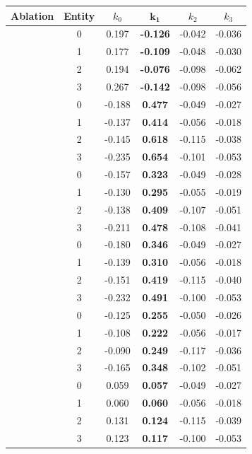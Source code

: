 \begin{tabular}{cccccc}

\toprule
Ablation & Entity & $k_0$ & $\boldsymbol{k_1}$ & $k_2$ & $k_3$ \\
\midrule

\addlinespace
\multirow[c]{4}{*}{KP} & 0 & 0.197 & \textbf{-0.126} & -0.042 & -0.036 \\
 & 1 & 0.177 & \textbf{-0.109} & -0.048 & -0.030 \\
 & 2 & 0.194 & \textbf{-0.076} & -0.098 & -0.062 \\
 & 3 & 0.267 & \textbf{-0.142} & -0.098 & -0.056 \\
\addlinespace
\multirow[c]{4}{*}{PE} & 0 & -0.188 & \textbf{0.477} & -0.049 & -0.027 \\
 & 1 & -0.137 & \textbf{0.414} & -0.056 & -0.018 \\
 & 2 & -0.145 & \textbf{0.618} & -0.115 & -0.038 \\
 & 3 & -0.235 & \textbf{0.654} & -0.101 & -0.053 \\
\addlinespace
\multirow[c]{4}{*}{KC} & 0 & -0.157 & \textbf{0.323} & -0.049 & -0.028 \\
 & 1 & -0.130 & \textbf{0.295} & -0.055 & -0.019 \\
 & 2 & -0.138 & \textbf{0.409} & -0.107 & -0.051 \\
 & 3 & -0.211 & \textbf{0.478} & -0.108 & -0.041 \\
\addlinespace
\multirow[c]{4}{*}{CE} & 0 & -0.180 & \textbf{0.346} & -0.049 & -0.027 \\
 & 1 & -0.139 & \textbf{0.310} & -0.056 & -0.018 \\
 & 2 & -0.151 & \textbf{0.419} & -0.115 & -0.040 \\
 & 3 & -0.232 & \textbf{0.491} & -0.100 & -0.053 \\
\addlinespace
\multirow[c]{4}{*}{CNS} & 0 & -0.125 & \textbf{0.255} & -0.050 & -0.026 \\
 & 1 & -0.108 & \textbf{0.222} & -0.056 & -0.017 \\
 & 2 & -0.090 & \textbf{0.249} & -0.117 & -0.036 \\
 & 3 & -0.165 & \textbf{0.348} & -0.102 & -0.051 \\
\addlinespace
\multirow[c]{4}{*}{NE} & 0 & 0.059 & \textbf{0.057} & -0.049 & -0.027 \\
 & 1 & 0.060 & \textbf{0.060} & -0.056 & -0.018 \\
 & 2 & 0.131 & \textbf{0.124} & -0.115 & -0.039 \\
 & 3 & 0.123 & \textbf{0.117} & -0.100 & -0.053 \\
\bottomrule
\end{tabular}